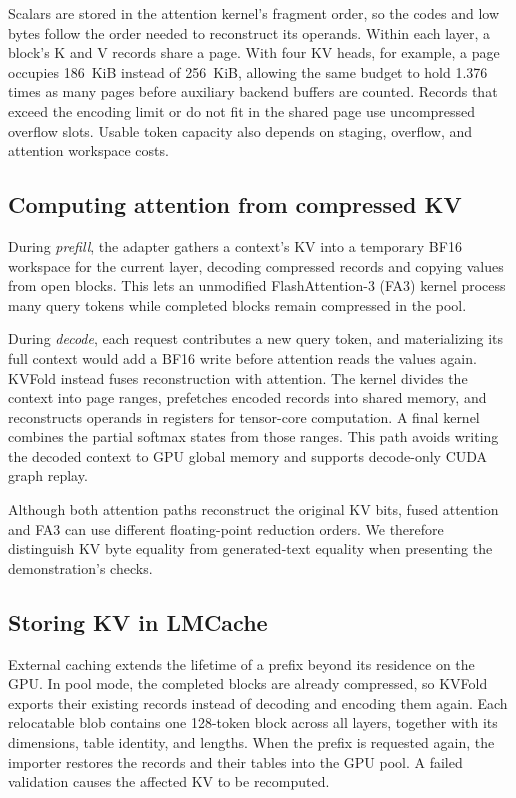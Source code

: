 \documentclass[conference]{IEEEtran}
\begin{document}
Scalars are stored in the attention kernel's fragment order, so the codes
and low bytes follow the order needed to reconstruct its operands. Within each layer, a
block's K and V records share a page. With four KV heads, for example,
a page occupies 186~KiB instead of 256~KiB, allowing the same budget to
hold 1.376 times as many pages before auxiliary backend buffers are counted. Records that
exceed the encoding limit or do not fit in the shared page use uncompressed
overflow slots. Usable token capacity also depends on staging, overflow,
and attention workspace costs.

\subsection{Computing attention from compressed KV}
During \emph{prefill}, the adapter gathers a context's KV into a temporary
BF16 workspace for the current layer, decoding compressed records and copying
values from open blocks. This lets an unmodified FlashAttention-3 (FA3) kernel
process many query tokens while completed blocks remain compressed in the pool.

During \emph{decode}, each request contributes a new query token, and
materializing its full context would add a BF16 write before attention
reads the values again. KVFold instead fuses reconstruction with attention.
The kernel divides the context into page ranges, prefetches encoded records
into shared memory, and reconstructs operands in registers for tensor-core
computation. A final kernel combines the partial softmax states from those
ranges. This path avoids writing the decoded context to GPU global memory
and supports decode-only CUDA graph replay.

Although both attention paths reconstruct the original KV bits, fused
attention and FA3 can use different floating-point reduction orders. We
therefore distinguish KV byte equality from generated-text equality when
presenting the demonstration's checks.



\subsection{Storing KV in LMCache}
External caching extends the lifetime of a prefix beyond its residence on
the GPU. In pool mode, the completed blocks are already compressed, so
KVFold exports their existing records instead of decoding and encoding
them again. Each relocatable blob contains one 128-token block across all
layers, together with its dimensions, table identity, and lengths. When
the prefix is requested again, the importer restores the records and their
tables into the GPU pool. A failed validation causes the affected KV to be
recomputed.
\end{document}

